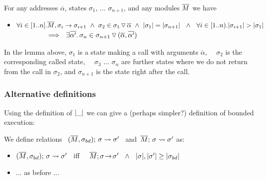 \begin{lemma}
\label{lemma:arguments}
For any addresses $\overline \alpha$, states $\sigma_1$, ... $\sigma_{n+1}$, and any modules $\Mtwo$ we have
\begin{itemize}
\item
$\forall i\in [1..n]. \Mtwo, \sigma_i \rightarrow \sigma_{i+1}\  \wedge\   \sigma_2\in \PushSLong{ \overline \alpha} {\sigma_1} \ \wedge \ \depth {\sigma_{1}}=\depth{\sigma_{n+1}}\ \ \wedge \ \  \forall i\in [1..n). \depth {\sigma_{i+1}} > \depth {\sigma_{1}}\  $\\
$\strut \ \ \ \ \ \ \ \ \ \ \ \ \  \Longrightarrow\ \  \exists \overline {\alpha'}. \, \sigma_{n}\in \PushSLong { (\overline \alpha,  \overline {\alpha'})} {\sigma_{n+1}}$

\end{itemize}
\end{lemma}

In the lemma above, $\sigma_1$ is a state making a call with arguments $\overline \alpha$, \ \ $\sigma_2$ is the corresponding called state, \ \ $\sigma_3$ ... $\sigma_{n}$ are further states where we do not return from the call in $\sigma_2$, and $\sigma_{n+1}$ is the state right after the call.


\subsubsection{Alternative definitions}

Using the definition of $\depth {\_}$ we can give a (perhaps simpler?) definition of bounded execution:

\begin{definition}
\label{def:shallow:term}
We define relations \    $\leadstoBoundedThree {\Mtwo} {\sigma} {\sigma\bd} {\sigma'}$ \ and\  $\leadstoBounded  {\Mtwo} {\sigma} {\sigma'}$ as:

\begin{itemize}
\item
 $\leadstoBoundedThree {\Mtwo} {\sigma} {\sigma\bd}  {\sigma'}$ \    iff \ \   $\leadstoOrig {\Mtwo} {\sigma} {\sigma'} %
\ \  \wedge \ \    \depth{\sigma}, \depth{\sigma'}\geq  \depth{\sigma\bd}$ 
\item
... as before ...
 \end{itemize}
\end{definition}

